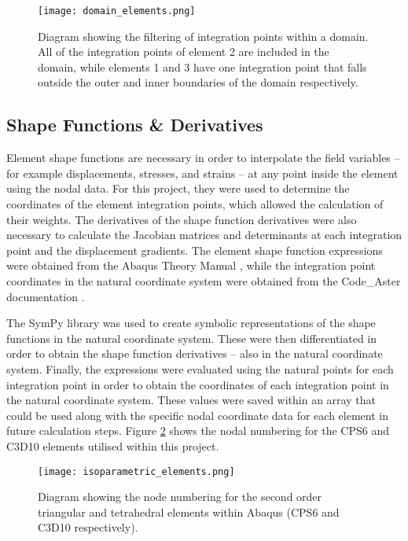 \begin{figure}[H]
	\centering
	\texttt{[image: domain\_elements.png]}
	\caption{Diagram showing the filtering of integration points within a domain. All of the integration points of element 2 are included in the domain, while elements 1 and 3 have one integration point that falls outside the outer and inner boundaries of the domain respectively.}
	\label{fig:domain_elements}
\end{figure}

\newpage
\subsection{Shape Functions \& Derivatives}

Element shape functions are necessary in order to interpolate the field variables -- for example displacements, stresses, and strains -- at any point inside the element using the nodal data. For this project, they were used to determine the coordinates of the element integration points, which allowed the calculation of their weights. The derivatives of the shape function derivatives were also necessary to calculate the Jacobian matrices and determinants at each integration point and the displacement gradients. The element shape function expressions were obtained from the Abaqus Theory Manual \cite{systemes_326_nodate}, while the integration point coordinates in the natural coordinate system were obtained from the Code\_Aster documentation \cite{aster_111_nodate}.

The SymPy library was used to create symbolic representations of the shape functions in the natural coordinate system. These were then differentiated in order to obtain the shape function derivatives -- also in the natural coordinate system. Finally, the expressions were evaluated using the natural points for each integration point in order to obtain the coordinates of each integration point in the natural coordinate system. These values were saved within an array that could be used along with the specific nodal coordinate data for each element in future calculation steps. Figure \ref{fig:isoparametric_elements} shows the nodal numbering for the CPS6 and C3D10 elements utilised within this project.

\begin{figure}[H]
	\centering
	\texttt{[image: isoparametric\_elements.png]}
	\caption{Diagram showing the node numbering for the second order triangular and tetrahedral elements within Abaqus (CPS6 and C3D10 respectively).}
	\label{fig:isoparametric_elements}
\end{figure}

